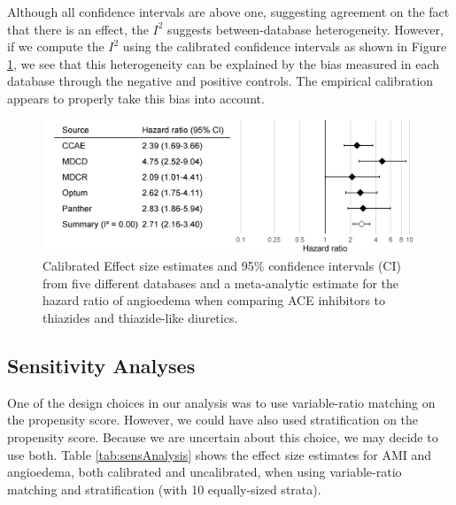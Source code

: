 \documentclass[11pt]{book}
\theoremstyle{definition}
\theoremstyle{definition}
\theoremstyle{definition}
\theoremstyle{remark}
\begin{document}
Although all confidence intervals are above one, suggesting agreement on
the fact that there is an effect, the \(I^2\) suggests between-database
heterogeneity. However, if we compute the \(I^2\) using the calibrated
confidence intervals as shown in Figure \ref{fig:forestCal}, we see that
this heterogeneity can be explained by the bias measured in each
database through the negative and positive controls. The empirical
calibration appears to properly take this bias into account.

\begin{figure}

{\centering \includegraphics[width=0.9\linewidth]{images/MethodValidity/forestCal} 

}

\caption{Calibrated Effect size estimates and 95\% confidence intervals (CI) from five different databases and a meta-analytic estimate for the hazard ratio of angioedema when comparing ACE inhibitors to thiazides and thiazide-like diuretics.}\label{fig:forestCal}
\end{figure}

\subsection{Sensitivity Analyses}\label{sensitivity-analyses-1}

One of the design choices in our analysis was to use variable-ratio
matching on the propensity score. However, we could have also used
stratification on the propensity score. Because we are uncertain about
this choice, we may decide to use both. Table \ref{tab:sensAnalysis}
shows the effect size estimates for AMI and angioedema, both calibrated
and uncalibrated, when using variable-ratio matching and stratification
(with 10 equally-sized strata).
\end{document}
